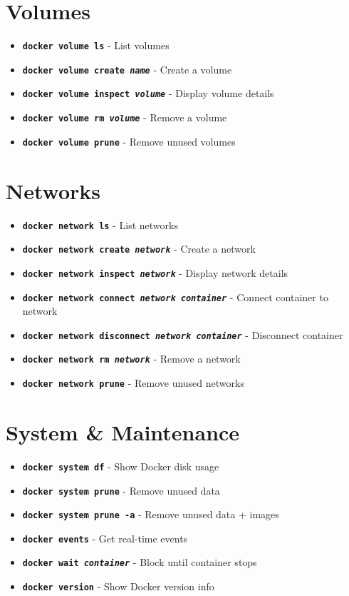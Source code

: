 \documentclass[10pt]{article}
\newcommand{\cmd}[1]{\texttt{#1}}
\newcommand{\dockitem}[2]{\item \textbf{\cmd{#1}} - #2}
\begin{document}
\begin{multicols}{2}
\section{Volumes}
\begin{itemize}[leftmargin=*,noitemsep]
\dockitem{docker volume ls}{List volumes}
\dockitem{docker volume create \textit{name}}{Create a volume}
\dockitem{docker volume inspect \textit{volume}}{Display volume details}
\dockitem{docker volume rm \textit{volume}}{Remove a volume}
\dockitem{docker volume prune}{Remove unused volumes}
\end{itemize}

\section{Networks}
\begin{itemize}[leftmargin=*,noitemsep]
\dockitem{docker network ls}{List networks}
\dockitem{docker network create \textit{network}}{Create a network}
\dockitem{docker network inspect \textit{network}}{Display network details}
\dockitem{docker network connect \textit{network container}}{Connect container to network}
\dockitem{docker network disconnect \textit{network container}}{Disconnect container}
\dockitem{docker network rm \textit{network}}{Remove a network}
\dockitem{docker network prune}{Remove unused networks}
\end{itemize}

\section{System \& Maintenance}
\begin{itemize}[leftmargin=*,noitemsep]
\dockitem{docker system df}{Show Docker disk usage}
\dockitem{docker system prune}{Remove unused data}
\dockitem{docker system prune -a}{Remove unused data + images}
\dockitem{docker events}{Get real-time events}
\dockitem{docker wait \textit{container}}{Block until container stops}
\dockitem{docker version}{Show Docker version info}
\end{itemize}


\end{multicols}
\end{document}
